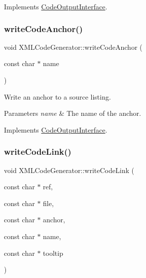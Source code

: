 Implements \mbox{\hyperlink{class_code_output_interface_ac90f75968cdcf127e0b02938bdb49d87}{Code\+Output\+Interface}}.

\mbox{\label{class_x_m_l_code_generator_a2c6ae0bc633493d36a2b517c44ebb8f4}} 
\subsubsection{\texorpdfstring{writeCodeAnchor()}{writeCodeAnchor()}}
{\footnotesize\ttfamily void X\+M\+L\+Code\+Generator\+::write\+Code\+Anchor (\begin{DoxyParamCaption}\item[{const char $\ast$}]{name }\end{DoxyParamCaption})\hspace{0.3cm}{\ttfamily [virtual]}}

Write an anchor to a source listing. 
\begin{DoxyParams}{Parameters}
{\em name} & The name of the anchor. \\
\hline
\end{DoxyParams}


Implements \mbox{\hyperlink{class_code_output_interface_a1f6394c4ef7c4143de90bcaf3a65c0b4}{Code\+Output\+Interface}}.

\mbox{\label{class_x_m_l_code_generator_aa0e45ec4ffd221b96f0af9202a098a29}} 
\subsubsection{\texorpdfstring{writeCodeLink()}{writeCodeLink()}}
{\footnotesize\ttfamily void X\+M\+L\+Code\+Generator\+::write\+Code\+Link (\begin{DoxyParamCaption}\item[{const char $\ast$}]{ref,  }\item[{const char $\ast$}]{file,  }\item[{const char $\ast$}]{anchor,  }\item[{const char $\ast$}]{name,  }\item[{const char $\ast$}]{tooltip }\end{DoxyParamCaption})\hspace{0.3cm}{\ttfamily [virtual]}}


